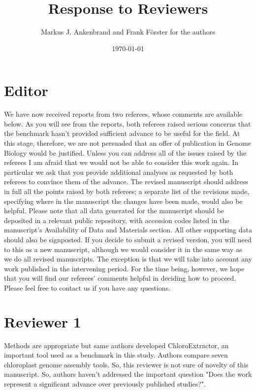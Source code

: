\documentclass[a4paper,10pt]{scrartcl}
\title{Response to Reviewers}
\author{Markus J. Ankenbrand and Frank F\"{o}rster for the authors}
\date{\today}
\begin{document}
\maketitle
\section{Editor}
We have now received reports from two referees, whose comments are available below.
As you will see from the reports, both referees raised serious concerns that the benchmark hasn't provided sufficient advance to be useful for the field.
At this stage, therefore, we are not persuaded that an offer of publication in Genome Biology would be justified.
Unless you can address all of the issues raised by the referees I am afraid that we would not be able to consider this work again.
In particular we ask that you provide additional analyses as requested by both referees to convince them of the advance.
The revised manuscript should address in full all the points raised by both referees; a separate list of the revisions made, specifying where in the manuscript the changes have been made, would also be helpful.
Please note that all data generated for the manuscript should be deposited in a relevant public repository, with accession codes listed in the manuscript's Availability of Data and Materials section.
All other supporting data should also be signposted.
If you decide to submit a revised version, you will need to  this as a new manuscript, although we would consider it in the same way as we do all revised manuscripts.
The exception is that we will take into account any work published in the intervening period.
For the time being, however, we hope that you will find our referees' comments helpful in deciding how to proceed.
Please feel free to contact us if you have any questions.

\section{Reviewer 1}
Methods are appropriate but same authors developed ChloroExtractor, an important tool used as a benchmark in this study.
Authors compare seven chloroplast genome assembly tools.
So, this reviewer is not sure of novelty of this manuscript.
So, authors haven't addressed the important question "Does the work represent a significant advance over previously published studies?".  
\end{document}
